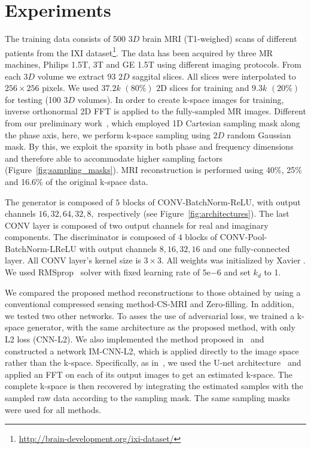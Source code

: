 \documentclass[review]{elsarticle}
\begin{document}
\section{Experiments}\label{experiments_section}

The training data consists of 500 $3D$ brain MRI (T1-weighed) scans of different patients from the IXI dataset\footnote{\url{http://brain-development.org/ixi-dataset/}}. The data has been acquired by three MR machines, Philips 1.5T, 3T and GE 1.5T using different imaging protocols.
From each $3D$ volume we extract 93 $2D$ saggital slices. All slices were interpolated to $256\times256$ pixels. We used $37.2k$ $(80\%)$ 2D slices for training and $9.3k$ $(20\%)$ for testing (100 $3D$ volumes).
In order to create k-space images for training, inverse orthonormal
2D FFT is applied to the fully-sampled MR images. 
Different from our preliminary work~\cite{shitrit2017accelerated}, which employed 1D Cartesian sampling mask along the phase axis, here, we perform k-space sampling using $2D$ random Gaussian mask. By this, we exploit the sparsity in both phase and frequency dimensions and therefore able to accommodate higher sampling factors (Figure~\ref{fig:sampling_masks}). MRI reconstruction is performed using 40\%, 25\% and 16.6\% of the original k-space data.

The generator is composed of $5$ blocks of CONV-BatchNorm-ReLU, with output channels $16,32,64,32,8,$ respectively (see Figure~\ref{fig:architectures}). The last CONV layer is composed of two output channels for real and imaginary components. The discriminator is composed of $4$ blocks of CONV-Pool-BatchNorm-LReLU with output channels $8,16,32,16$ and one fully-connected layer. All CONV layer's kernel size is $3\times3$. All weights was initialized by Xavier \cite{glorot2010understanding}. We used RMSprop~\cite{tieleman2012lecture} solver with fixed learning rate of $5\mathrm{e}{-6}$ and set $k_{d}$ to 1.

We compared the proposed method reconstructions to those obtained by using a conventional compressed sensing method-CS-MRI \cite{lustig2007sparse} and Zero-filling. In addition, we tested two other networks. To asses the use of adversarial loss, we trained a k-space generator, with the same architecture as the proposed method, with only L2 loss (CNN-L2). We also implemented the method proposed in~\cite{hyun2017deep} and constructed a network IM-CNN-L2, which is applied directly to the image space rather than the k-space. Specifically, as in~\cite{hyun2017deep}, we used the U-net architecture~\cite{ronneberger2015u} and applied an FFT on each of its output images to get an estimated k-space. The complete k-space is then recovered by integrating the estimated samples with the sampled raw data according to the sampling mask. The same sampling masks were used for all methods.
\end{document}
